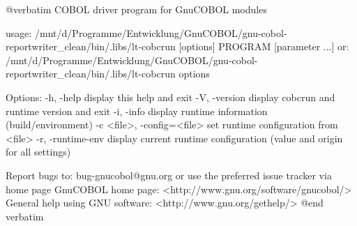 @verbatim
COBOL driver program for GnuCOBOL modules

usage: /mnt/d/Programme/Entwicklung/GnuCOBOL/gnu-cobol-reportwriter_clean/bin/.libs/lt-cobcrun [options] PROGRAM [parameter ...]
  or:  /mnt/d/Programme/Entwicklung/GnuCOBOL/gnu-cobol-reportwriter_clean/bin/.libs/lt-cobcrun options

Options:
  -h, -help             display this help and exit
  -V, -version          display cobcrun and runtime version and exit
  -i, -info             display runtime information (build/environment)
  -c <file>, -config=<file>   set runtime configuration from <file>
  -r, -runtime-env      display current runtime configuration
                        (value and origin for all settings)

Report bugs to: bug-gnucobol@gnu.org or
use the preferred issue tracker via home page
GnuCOBOL home page: <http://www.gnu.org/software/gnucobol/>
General help using GNU software: <http://www.gnu.org/gethelp/>
@end verbatim

